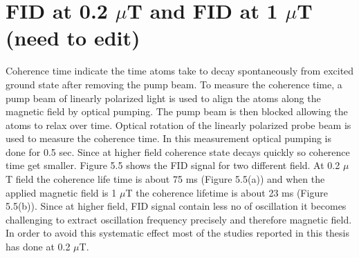 \documentclass[12pt]{report}
\begin{document}
   \section{FID at 0.2 $\mu$T and FID at 
  1 $\mu$T (need to edit) }
  Coherence time indicate the time atoms take to decay spontaneously from excited ground state after removing the pump beam. To measure the coherence time, a pump beam of linearly polarized light is
used to align the atoms along the magnetic field by optical pumping. The pump
beam is then blocked allowing the atoms to relax over time. Optical rotation of the linearly polarized probe beam is used to measure the coherence time. In this measurement optical pumping is done for 0.5 sec. Since at higher field coherence state decays quickly so coherence time get smaller. Figure 5.5 shows the FID signal for  two different field.  At 0.2 $\mu$T field the coherence life time is about 75 ms (Figure 5.5(a)) and when the applied magnetic field is 1 $\mu$T  the coherence lifetime is about 23 ms (Figure 5.5(b)). Since at higher field, FID signal contain less no of oscillation it becomes challenging to extract oscillation frequency precisely and therefore magnetic field. In order to avoid this systematic effect most of the studies reported in this thesis has done at 0.2 $\mu$T.
\end{document}
